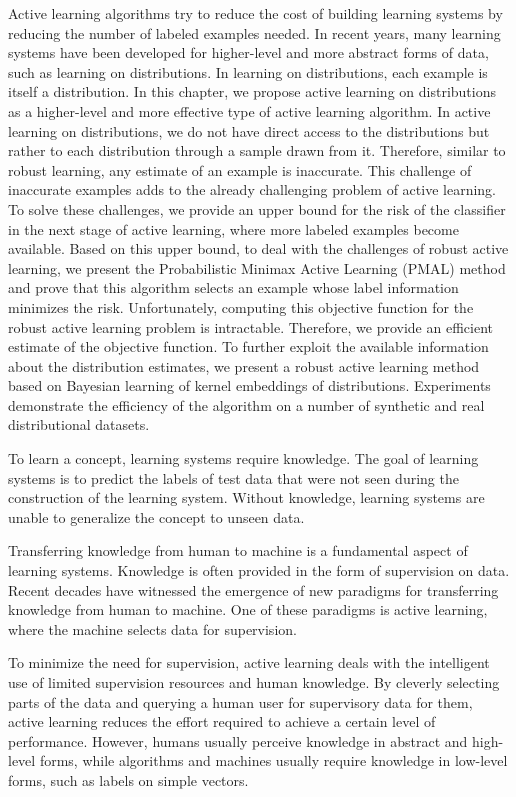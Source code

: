 	Active learning algorithms try to reduce the cost of building learning systems by reducing the number of labeled examples needed. In recent years, many learning systems have been developed for higher-level and more abstract forms of data, such as learning on distributions. In learning on distributions, each example is itself a distribution. In this chapter, we propose active learning on distributions as a higher-level and more effective type of active learning algorithm. In active learning on distributions, we do not have direct access to the distributions but rather to each distribution through a sample drawn from it. Therefore, similar to robust learning, any estimate of an example is inaccurate. This challenge of inaccurate examples adds to the already challenging problem of active learning. To solve these challenges, we provide an upper bound for the risk of the classifier in the next stage of active learning, where more labeled examples become available. Based on this upper bound, to deal with the challenges of robust active learning, we present the Probabilistic Minimax Active Learning (PMAL) method and prove that this algorithm selects an example whose label information minimizes the risk. Unfortunately, computing this objective function for the robust active learning problem is intractable. Therefore, we provide an efficient estimate of the objective function. To further exploit the available information about the distribution estimates, we present a robust active learning method based on Bayesian learning of kernel embeddings of distributions. Experiments demonstrate the efficiency of the algorithm on a number of synthetic and real distributional datasets.
	
	To learn a concept, learning systems require knowledge. The goal of learning systems is to predict the labels of test data that were not seen during the construction of the learning system. Without knowledge, learning systems are unable to generalize the concept to unseen data.
	
	Transferring knowledge from human to machine is a fundamental aspect of learning systems. Knowledge is often provided in the form of supervision on data. Recent decades have witnessed the emergence of new paradigms for transferring knowledge from human to machine. One of these paradigms is active learning, where the machine selects data for supervision.
	
	To minimize the need for supervision, active learning deals with the intelligent use of limited supervision resources and human knowledge. By cleverly selecting parts of the data and querying a human user for supervisory data for them, active learning reduces the effort required to achieve a certain level of performance. However, humans usually perceive knowledge in abstract and high-level forms, while algorithms and machines usually require knowledge in low-level forms, such as labels on simple vectors.
	
